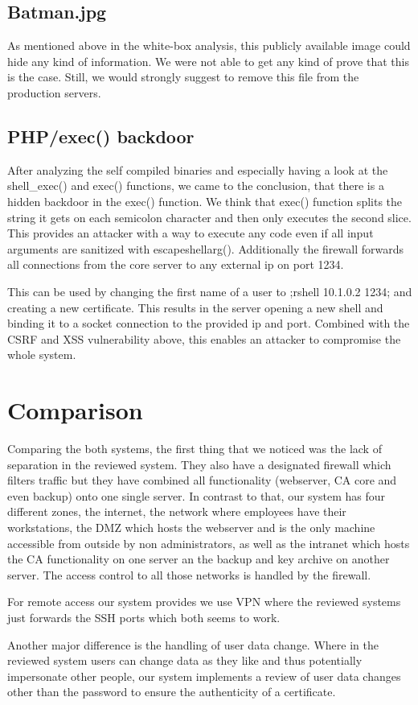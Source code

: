 \documentclass{article}
\begin{document}
\subsection{Batman.jpg}
As mentioned above in the white-box analysis, this publicly available image could hide any kind of information. We were not able to get any kind of prove that this is the case. Still, we would strongly suggest to remove this file from the production servers.

\subsection{PHP/exec() backdoor}
After analyzing the self compiled binaries and especially having a look at the shell\_exec() and exec() functions, we came to the conclusion, that there is a hidden backdoor in the exec() function. We think that exec() function splits the string it gets on each semicolon character and then only executes the second slice. This provides an attacker with a way to execute any code even if all input arguments are sanitized with escapeshellarg(). Additionally the firewall forwards all connections from the core server to any external ip on port 1234.

This can be used by changing the first name of a user to ;rshell 10.1.0.2 1234; and creating a new certificate. This results in the server opening a new shell and binding it to a socket connection to the provided ip and port. Combined with the CSRF and XSS vulnerability above, this enables an attacker to compromise the whole system.

\section{Comparison}
Comparing the both systems, the first thing that we noticed was the lack of separation in the reviewed system. They also have a designated firewall which filters traffic but they have combined all functionality (webserver, CA core and even backup) onto one single server. In contrast to that, our system has four different zones, the internet, the network where employees have their workstations, the DMZ which hosts the webserver and is the only machine accessible from outside by non administrators, as well as the intranet which hosts the CA functionality on one server an the backup and key archive on another server. The access control to all those networks is handled by the firewall.

For remote access our system provides we use VPN where the reviewed systems just forwards the SSH ports which both seems to work.

Another major difference is the handling of user data change. Where in the reviewed system users can change data as they like and thus potentially impersonate other people, our system implements a review of user data changes other than the password to ensure the authenticity of a certificate.
\end{document}

